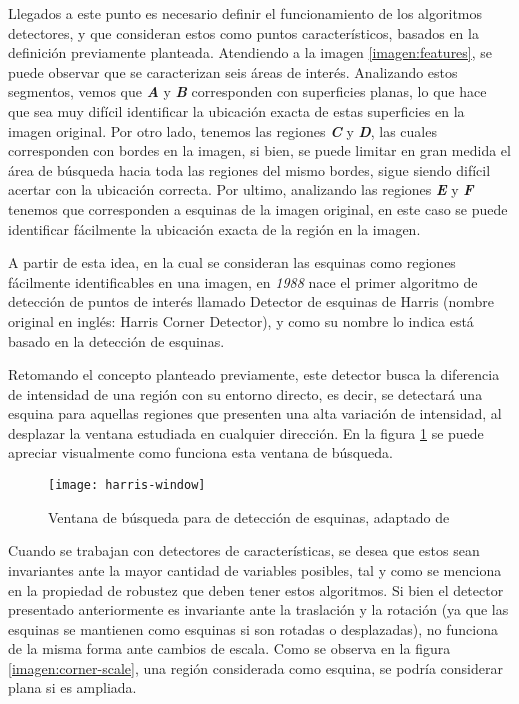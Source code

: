 Llegados a este punto es necesario definir el funcionamiento de los algoritmos detectores, y que consideran estos como puntos característicos, basados en la definición previamente planteada. Atendiendo a la imagen \ref{imagen:features}, se puede observar que se caracterizan seis áreas de interés. Analizando estos segmentos, vemos que \textbf{\textit{A}} y \textbf{\textit{B}} corresponden con superficies planas, lo que hace que sea muy difícil identificar la ubicación exacta de estas superficies en la imagen original. Por otro lado, tenemos las regiones \textbf{\textit{C}} y \textbf{\textit{D}}, las cuales corresponden con bordes en la imagen, si bien, se puede limitar en gran medida el área de búsqueda hacia toda las regiones del mismo bordes, sigue siendo difícil acertar con la ubicación correcta. Por ultimo, analizando las regiones \textbf{\textit{E}} y \textbf{\textit{F}} tenemos que corresponden a esquinas de la imagen original, en este caso se puede identificar fácilmente la ubicación exacta de la región en la imagen.

A partir de esta idea, en la cual se consideran las esquinas como regiones fácilmente identificables en una imagen, en \textit{1988} nace el primer algoritmo de detección de puntos de interés llamado Detector de esquinas de Harris \cite{harris} (nombre original en inglés: Harris Corner Detector), y como su nombre lo indica está basado en la detección de esquinas.

Retomando el concepto planteado previamente, este detector busca la diferencia de intensidad de una región con su entorno directo, es decir, se detectará una esquina para aquellas regiones que presenten una alta variación de intensidad, al desplazar la ventana estudiada en cualquier dirección. En la figura \ref{imagen:harris-window} se puede apreciar visualmente como funciona esta ventana de búsqueda.

\begin{figure}[H]
	\centering
	\texttt{[image: harris-window]}
	\caption[Ventana de búsqueda para de detección de esquinas]{Ventana de búsqueda para de detección de esquinas, adaptado de\protect\footnotemark}
	\label{imagen:harris-window}
\end{figure}

Cuando se trabajan con detectores de características, se desea que estos sean invariantes ante la mayor cantidad de variables posibles, tal y como se menciona en la propiedad de robustez que deben tener estos algoritmos. Si bien el detector presentado anteriormente es invariante ante la traslación y la rotación (ya que las esquinas se mantienen como esquinas si son rotadas o desplazadas), no funciona de la misma forma ante cambios de escala. Como se observa en la figura \ref{imagen:corner-scale}, una región considerada como esquina, se podría considerar plana si es ampliada.

